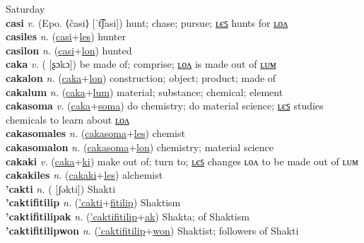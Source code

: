 Saturday \label{cahsunkwelwel} \\
\textbf{casi} \textit{v.} (Epo. ⟨ĉasi⟩ [ˈt͡ʃasi])
hunt; chase; pursue; \hyperref[casiles]{ʟєꜱ} hunts for \hyperref[casilon]{ʟᴏᴧ} \label{casi} \\
\textbf{casiles} \textit{n.} (\hyperref[casi]{casi}+\hyperref[les]{les})
hunter \label{casiles} \\
\textbf{casilon} \textit{n.} (\hyperref[casi]{casi}+\hyperref[lon]{lon})
hunted \label{casilon} \\
\textbf{caka} \textit{v.} ( [ʂɔkɔ])
be made of; comprise; \hyperref[cakalon]{ʟᴏᴧ} is made out of \hyperref[cakalum]{ʟᴜᴍ} \label{caka} \\
\textbf{cakalon} \textit{n.} (\hyperref[caka]{caka}+\hyperref[lon]{lon})
construction; object; product; made of \label{cakalon} \\
\textbf{cakalum} \textit{n.} (\hyperref[caka]{caka}+\hyperref[lum]{lum})
material; substance; chemical; element \label{cakalum} \\
\textbf{cakasoma} \textit{v.} (\hyperref[caka]{caka}+\hyperref[soma]{soma})
do chemistry; do material science; \hyperref[cakasomales]{ʟєꜱ} studies chemicals to learn about \hyperref[cakasomalon]{ʟᴏᴧ} \label{cakasoma} \\
\textbf{cakasomales} \textit{n.} (\hyperref[cakasoma]{cakasoma}+\hyperref[les]{les})
chemist \label{cakasomales} \\
\textbf{cakasomalon} \textit{n.} (\hyperref[cakasoma]{cakasoma}+\hyperref[lon]{lon})
chemistry; material science \label{cakasomalon} \\
\textbf{cakaki} \textit{v.} (\hyperref[caka]{caka}+\hyperref[ki]{ki})
make out of; turn to; \hyperref[cakakiles]{ʟєꜱ} changes ʟᴏᴧ to be made out of ʟᴜᴍ \label{cakaki} \\
\textbf{cakakiles} \textit{n.} (\hyperref[cakaki]{cakaki}+\hyperref[les]{les})
alchemist \label{cakakiles} \\
\textbf{'cakti} \textit{n.} ( [ʃəkti])
Shakti \label{'cakti} \\
\textbf{'caktifitilip} \textit{n.} (\hyperref['cakti]{'cakti}+\hyperref[fitilip]{fitilip})
Shaktism \label{'caktifitilip} \\
\textbf{'caktifitilipak} \textit{n.} (\hyperref['caktifitilip]{'caktifitilip}+\hyperref[ak]{ak})
Shakta; of Shaktism \label{'caktifitilipak} \\
\textbf{'caktifitilipwon} \textit{n.} (\hyperref['caktifitilip]{'caktifitilip}+\hyperref[won]{won})
Shaktist; followers of Shakti \label{'caktifitilipwon} \\
